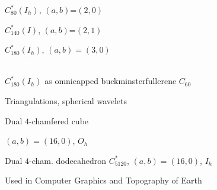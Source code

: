 \documentclass[%
pdf,
colorBG,
slideColor,
]{prosper}
\begin{document}
\begin{slide}{}
\begin{center}
\begin{minipage}[b]{5.5cm}
\centering
{}\par
$C_{80}^*(I_h)$,  $(a,b)$=$(2,0)$
\end{minipage}
\begin{minipage}[b]{5.5cm}
\centering
{}\par
$C_{140}^*(I)$,  $(a,b)$=$(2,1)$
\end{minipage}
\end{center}
\end{slide}



\begin{slide}{}
\begin{center}
\begin{minipage}[b]{5.5cm}
\centering
{}\par
$C_{180}^*(I_h)$, $(a,b)=(3,0)$\\
\textcolor{white}{Bonjour}
\end{minipage}
\begin{minipage}[b]{5.5cm}
\centering
{}\par
$C_{180}^*(I_h)$ as omnicapped buckminsterfullerene $C_{60}$
\end{minipage}
\end{center}
\end{slide}





\begin{slide}{Triangulations, spherical wavelets}
\begin{center}
\begin{minipage}[b]{5.5cm}
\centering
{}\par
Dual $4$-chamfered cube \par
$(a,b)=(16,0)$, $O_h$
\end{minipage}
\begin{minipage}[b]{5.5cm}
\centering
{}\par
Dual $4$-cham.
dodecahedron $C^*_{5120}$,
$(a,b)=(16,0)$, $I_h$
\end{minipage}
\end{center}
\vspace{7mm}
\begin{center}
Used in Computer Graphics and Topography of Earth
\end{center}



\end{slide}
\end{document}
